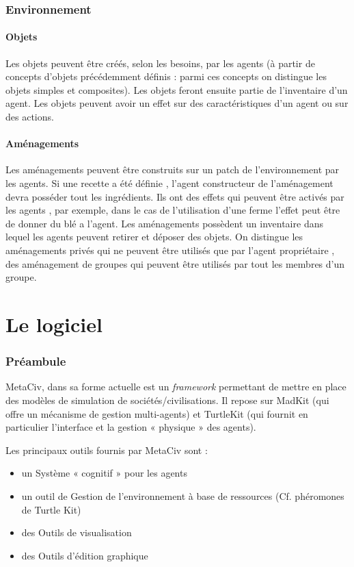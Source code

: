\documentclass[a4paper,oneside,12 pt]{article}
\begin{document}
\section{Environnement}

\subsection{Objets}
Les objets peuvent être créés, selon les besoins, par les agents (à partir de concepts d'objets précédemment définis : parmi ces concepts on distingue les objets simples et composites). Les objets feront ensuite partie de l'inventaire d'un agent. Les objets peuvent avoir un effet sur des caractéristiques d'un agent ou sur des actions. 

\subsection{Aménagements}
Les aménagements peuvent être construits sur un patch de l'environnement par les agents. Si une recette a été définie , l'agent constructeur de l'aménagement devra posséder tout les ingrédients. Ils ont des effets qui peuvent être activés par les agents , par exemple, dans le cas de l'utilisation d'une ferme l'effet peut être de donner du blé a l'agent. Les aménagements possèdent un inventaire dans lequel les agents peuvent retirer et déposer des objets. On distingue les aménagements privés qui ne peuvent être utilisés que par l'agent propriétaire , des aménagement de groupes qui peuvent être utilisés par tout les membres d'un groupe.


\newpage
\part{Le  logiciel}
\section{Préambule}
MetaCiv, dans sa forme actuelle est un \textit{framework} permettant de mettre en place des modèles de simulation de sociétés/civilisations. Il repose sur MadKit (qui offre un mécanisme de gestion multi-agents) et TurtleKit (qui fournit en particulier l’interface et la gestion « physique » des agents).

Les principaux outils fournis par MetaCiv sont :
\begin{itemize}
\item un Système « cognitif » pour les agents
\item un outil de Gestion de l’environnement à base de ressources (Cf. phéromones de Turtle Kit)
\item des Outils de visualisation
\item des Outils d’édition graphique
\end{itemize}
\end{document}
